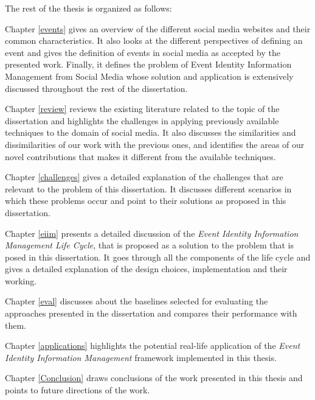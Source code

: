 %
%
%
%

The rest of the thesis is organized as follows:

Chapter \ref{events} gives an overview of the different social media websites and their common characteristics. It also looks at the different perspectives of defining an event and gives the definition of events in social media as accepted by the presented work. Finally, it defines the problem of Event Identity Information Management from Social Media whose solution and application is extensively discussed throughout the rest of the dissertation.

Chapter \ref{review} reviews the existing literature related to the topic of the dissertation and highlights the challenges in applying previously available techniques to the domain of social media. It also discusses the similarities and dissimilarities of our work with the previous ones, and identifies the areas of our novel contributions that makes it different from the available techniques.

Chapter \ref{challenges} gives a detailed explanation of the challenges that are relevant to the problem of this dissertation. It discusses different scenarios in which these problems occur and point to their solutions as proposed in this dissertation.


Chapter \ref{eiim} presents a detailed discussion of the \textit{Event Identity Information Management Life Cycle}, that is proposed as a solution to the problem that is posed in this dissertation. It goes through all the components of the life cycle and gives a detailed explanation of the design choices, implementation and their working.

Chapter \ref{eval} discusses about the baselines selected for evaluating the approaches presented in the dissertation and compares their performance with them. 

Chapter \ref{applications} highlights the potential real-life application of the \textit{Event Identity Information Management} framework implemented in this thesis. 

Chapter \ref{Conclusion} draws conclusions of the work presented in this thesis and points to future directions of the work.
